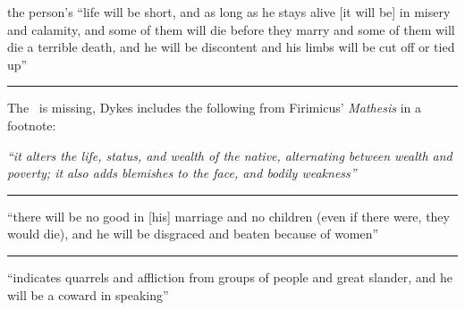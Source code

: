 \begin{description}[style=multiline,leftmargin=1.5cm]
\item[\Mars\Opposition\Moon] the person's ``life will be short, and as long as he stays alive [it will be] in misery and calamity, and some of them will die before they marry and some of them will die a terrible death, and he will be discontent and his limbs will be cut off or tied up''

\vspace{0.5em}\hrule
\begin{mdframed}[backgroundcolor=cyan!5, rightmargin=1em, leftmargin=1em]
The \Sun\Opposition\Moon\, is missing, Dykes includes the following from Firimicus' \textsl{Mathesis} in a footnote: 
\end{mdframed}

\item[\Sun\Opposition\Moon] 
\textsl{``it alters the life, status, and wealth of the native, alternating between wealth and poverty; it also adds blemishes to the face, and bodily weakness''}

\vspace{0.5em}\hrule
\item[\Venus\Opposition\Moon] ``there will be no good in [his] marriage and no children (even if there were, they would die), and he will be disgraced and beaten because of women''

\vspace{0.5em}\hrule
\item[\Mercury\Opposition\Moon] ``indicates quarrels and affliction from groups of people and great slander, and he will be a coward in speaking''
\end{description}
